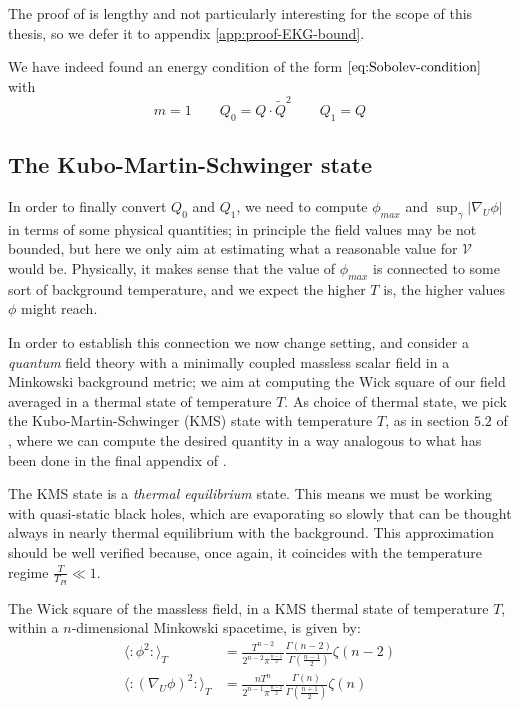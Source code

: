 The proof of is lengthy and not particularly interesting for the scope of this thesis, so we defer it to appendix \ref{app:proof-EKG-bound}.

We have indeed found an energy condition of the form \(\eqref{eq:Sobolev-condition}\) with 
\[
m = 1 \quad\quad Q_0 = Q\cdot\tilde{Q}^2 \quad\quad Q_1 = Q 
\]

\subsection{The Kubo-Martin-Schwinger state}

In order to finally convert \(Q_0\) and \(Q_1\), we need to compute \(\phi_{max}\) and \(\sup_{\gamma}\vert \nabla_U\phi\vert\) in terms of some physical quantities; in principle the field values may be not bounded, but here we only aim at estimating what a reasonable value for \(\mathcal{V}\) would be.
Physically, it makes sense that the value of \(\phi_{max}\) is connected to some sort of background temperature, and we expect the higher \(T\) is, the higher values \(\phi\) might reach.

In order to establish this connection we now change setting, and consider a \emph{quantum} field theory with a minimally coupled massless scalar field in a Minkowski background metric; we aim at computing the Wick square of our field averaged in a thermal state of temperature \(T\). As choice of thermal state, we pick the Kubo-Martin-Schwinger (KMS) state with temperature \(T\), as in section \(5.2\) of \cite{fewster2020new}, where we can compute the desired quantity in a way analogous to what has been done in the final appendix of \cite{brown2018singularity}.


\begin{remark}
	The KMS state is a \emph{thermal equilibrium} state. This means we must be working with quasi-static black holes, which are evaporating so slowly that can be thought always in nearly thermal equilibrium with the background. This approximation should be well verified because, once again, it coincides with the temperature regime \(\frac{T}{T_{Pl}}\ll 1\).
\end{remark}

\begin{prop}
	\label{prop:wick-squares-KMS}
    The Wick square of the massless field, in a KMS thermal state of temperature \(T\), within a \(n\)-dimensional Minkowski spacetime, is given by:
    \begin{align*}
         \langle \colon \phi^2 \colon\rangle_T &= \frac{T^{n - 2}}{2^{n - 2}\pi^{\frac{n - 1}{2}}}\frac{\Gamma(n - 2)}{\Gamma\left(\frac{n - 1}{2}\right)}\zeta(n - 2) \\
        \langle \colon (\nabla_U\phi)^2 \colon\rangle_T &= \frac{nT^n}{2^{n - 1}\pi^{\frac{n - 1}{2}}} \frac{\Gamma(n)}{\Gamma\left(\frac{n + 1}{2}\right)} \zeta(n)
    \end{align*}

\end{prop}
    
